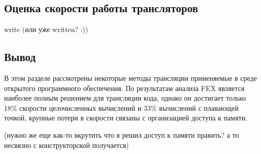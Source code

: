 \subsection{Оценка скорости работы трансляторов}

write (или уже written? :))

\subsection{Вывод}

В этом разделе рассмотрены некоторые методы трансляции применяемые в среде открытого программного обеспечения. По результатам анализа FEX является наиболее полным решением для трансляции кода, однако он достигает только 18\% скорости целочисленных вычислений и 33\% вычислений с плавающей точкой, крупные потери в скорости связаны с организацией доступа к памяти.

(нужно же еще как-то вкрутить что я решил доступ к памяти править? а то несвязно с конструкторской получается)

